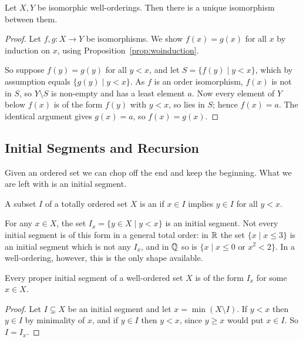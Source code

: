 \documentclass[a4paper]{scrartcl}
\begin{document}
\begin{proposition}\label{prop:uniqueiso}
  Let $X, Y$ be isomorphic well-orderings. Then there is a unique isomorphism between them.
\end{proposition}
\begin{proof}
  Let $f, g: X \rightarrow Y$ be isomorphisms. We show $f(x) = g(x)$ for all $x$ by induction on $x$, using Proposition~\ref{prop:woinduction}.

  So suppose $f(y) = g(y)$ for all $y < x$, and let $S = \{f(y) \mid y < x\}$, which by assumption equals $\{g(y) \mid y < x\}$. As $f$ is an order isomorphism, $f(x)$ is not in $S$, so $Y \setminus S$ is non-empty and has a least element $a$. Now every element of $Y$ below $f(x)$ is of the form $f(y)$ with $y < x$, so lies in $S$; hence $f(x) = a$. The identical argument gives $g(x) = a$, so $f(x) = g(x)$.
\end{proof}

\subsection{Initial Segments and Recursion}

Given an ordered set we can chop off the end and keep the beginning. What we are left with is an initial segment.

\begin{definition}
  A subset $I$ of a totally ordered set $X$ is an  if $x \in I$ implies $y \in I$ for all $y < x$.
\end{definition}

For any $x \in X$, the set $I_x = \{y \in X \mid y < x\}$ is an initial segment. Not every initial segment is of this form in a general total order: in $\mathbb{R}$ the set $\{x \mid x \leq 3\}$ is an initial segment which is not any $I_x$, and in $\mathbb{Q}$ so is $\{x \mid x \leq 0 \text{ or } x^2 < 2\}$. In a well-ordering, however, this is the only shape available.

\begin{proposition}\label{prop:initialsegs}
  Every proper initial segment of a well-ordered set $X$ is of the form $I_x$ for some $x \in X$.
\end{proposition}
\begin{proof}
  Let $I \subsetneq X$ be an initial segment and let $x = \min(X \setminus I)$. If $y < x$ then $y \in I$ by minimality of $x$, and if $y \in I$ then $y < x$, since $y \geq x$ would put $x \in I$. So $I = I_x$.
\end{proof}
\end{document}
